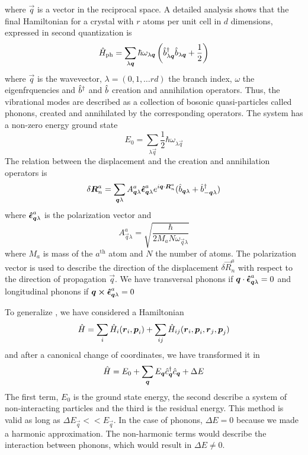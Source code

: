where $\vec{q}$ is a vector in the reciprocal space. A detailed analysis shows that the final Hamiltonian for a crystal with $r$ atoms per unit cell in $d$ dimensions, expressed in second quantization is
\begin{equation} \label{eq:phonon_hamiltonian}
    \hat{H}_\text{ph} = \sum_{\lambda \mathbf{\boldsymbol{q}}} \hbar \omega_{\lambda\mathbf{\boldsymbol{q}}} \left( \hat{b}^\dagger_{\lambda \mathbf{\boldsymbol{q}}} \hat{b}_{\lambda \mathbf{\boldsymbol{q}}} + \frac{1}{2} \right)
\end{equation}
where $\vec{q}$ is the wavevector, $\lambda = (0,1,\dots rd)$ the branch index, $\omega$ the eigenfrquencies and $\hat{b}^\dagger$ and $\hat{b}$ creation and annihilation operators. Thus, the vibrational modes are described as a collection of bosonic quasi-particles called phonons, created and annihilated by the corresponding operators. The system has a non-zero energy ground state
\begin{equation}
    E_0 = \sum_{\lambda \vec{q}} \frac{1}{2} \hbar\omega_{\lambda\vec{q}}
\end{equation}
The relation between the displacement and the creation and annihilation operators is
\begin{equation} \label{eq:phonon_coordinates}
    \delta \mathbf{\boldsymbol{R}}_n^a = \sum_{\mathbf{\boldsymbol{q}}\lambda} A_{\mathbf{\boldsymbol{q}}\lambda}^a \mathbf{\boldsymbol{\hat{\epsilon}}}_{\mathbf{\boldsymbol{q}}\lambda}^a e^{i\mathbf{\boldsymbol{q}} \cdot \mathbf{\boldsymbol{R}}_n^a} (\hat{b}_{\mathbf{\boldsymbol{q}}\lambda} + \hat{b}^\dagger_{-\mathbf{\boldsymbol{q}}\lambda})
\end{equation}
where $\mathbf{\boldsymbol{\hat{\epsilon}}}_{\mathbf{\boldsymbol{q}}\lambda}^a$ is the polarization vector and
\begin{equation} \label{eq:A_phonon_constant}
    A_{\vec{q}\lambda}^a = \sqrt{\frac{\hbar}{2M_aN\omega_{\vec{q}\lambda}}}
\end{equation}
where $M_a$ is mass of the $a^\text{th}$ atom and $N$ the number of atoms. The polarization vector is used to describe the direction of the displacement $\delta \vec{R}_n^a$ with respect to the direction of propagation $\vec{q}$. We have transversal phonons if $\mathbf{\boldsymbol{q}} \cdot \mathbf{\boldsymbol{\hat{\epsilon}}}_{\mathbf{\boldsymbol{q}}\lambda}^a = 0$ and longitudinal phonons if $\mathbf{\boldsymbol{q}} \cross \mathbf{\boldsymbol{\hat{\epsilon}}}_{\mathbf{\boldsymbol{q}}\lambda}^a = 0$

To generalize \cite{cohenFundamentalsCondensedMatter}, we have considered a Hamiltonian
\begin{equation}
    \hat{H} = \sum_i \hat{H}_i(\mathbf{\boldsymbol{r}}_i, \mathbf{\boldsymbol{p}}_i) + \sum_{ij} \hat{H}_{ij}(\mathbf{\boldsymbol{r}}_i, \mathbf{\boldsymbol{p}}_i, \mathbf{\boldsymbol{r}}_j, \mathbf{\boldsymbol{p}}_j)
\end{equation}
and after a canonical change of coordinates, we have transformed it in
\begin{equation}
    \hat{H} = E_0 + \sum_{\mathbf{\boldsymbol{q}}} E_{\mathbf{\boldsymbol{q}}} \hat{c}^\dagger_{\mathbf{\boldsymbol{q}}}\hat{c}_{\mathbf{\boldsymbol{q}}} + \Delta E
\end{equation}
The first term, $E_0$ is the ground state energy, the second describe a system of non-interacting particles and the third is the residual energy. This method is valid as long as $\Delta E_\vec{q} << E_\vec{q}$. In the case of phonons, $\Delta E = 0$ because we made a harmonic approximation. The non-harmonic terms would describe the interaction between phonons, which would result in $\Delta E \neq 0$.

